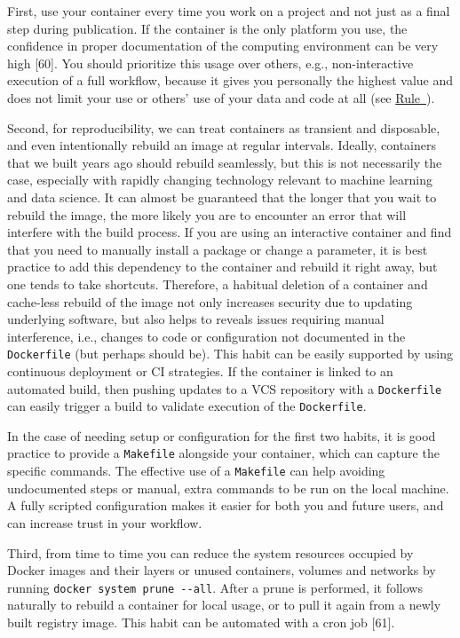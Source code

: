\documentclass[10pt,letterpaper]{article}
\begin{document}
First, use your container every time you work on a project and not just
as a final step during publication. If the container is the only
platform you use, the confidence in proper documentation of the
computing environment can be very high {[}60{]}. You should prioritize
this usage over others, e.g., non-interactive execution of a full
workflow, because it gives you personally the highest value and does not
limit your use or others' use of your data and code at all (see
\hyperref[{rule:interactive}]{Rule~}).

Second, for reproducibility, we can treat containers as transient and
disposable, and even intentionally rebuild an image at regular
intervals. Ideally, containers that we built years ago should rebuild
seamlessly, but this is not necessarily the case, especially with
rapidly changing technology relevant to machine learning and data
science. It can almost be guaranteed that the longer that you wait to
rebuild the image, the more likely you are to encounter an error that
will interfere with the build process. If you are using an interactive
container and find that you need to manually install a package or change
a parameter, it is best practice to add this dependency to the container
and rebuild it right away, but one tends to take shortcuts. Therefore, a
habitual deletion of a container and cache-less rebuild of the image not
only increases security due to updating underlying software, but also
helps to reveals issues requiring manual interference, i.e., changes to
code or configuration not documented in the \texttt{Dockerfile} (but
perhaps should be). This habit can be easily supported by using
continuous deployment or CI strategies. If the container is linked to an
automated build, then pushing updates to a VCS repository with a
\texttt{Dockerfile} can easily trigger a build to validate execution of
the \texttt{Dockerfile}.

In the case of needing setup or configuration for the first two habits,
it is good practice to provide a \texttt{Makefile} alongside your
container, which can capture the specific commands. The effective use of
a \texttt{Makefile} can help avoiding undocumented steps or manual,
extra commands to be run on the local machine. A fully scripted
configuration makes it easier for both you and future users, and can
increase trust in your workflow.

Third, from time to time you can reduce the system resources occupied by
Docker images and their layers or unused containers, volumes and
networks by running \texttt{docker\ system\ prune\ -\/-all}. After a
prune is performed, it follows naturally to rebuild a container for
local usage, or to pull it again from a newly built registry image. This
habit can be automated with a cron job {[}61{]}.
\end{document}
